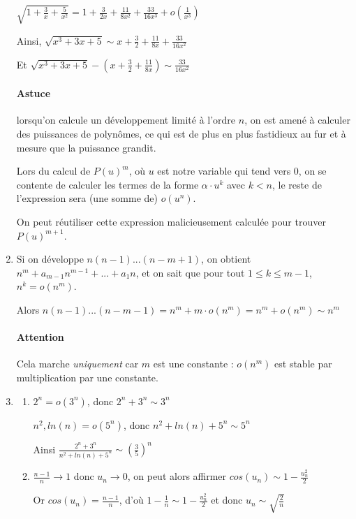\documentclass[]{article}
\begin{document}
\begin{enumerate}
$\sqrt{1+\frac{3}{x}+\frac{5}{x^2}}=1+\frac{3}{2x}+\frac{11}{8x^2}+\frac{33}{16x^3}+o(\frac{1}{x^3})$

Ainsi, $\sqrt{x^3+3x+5} \sim x + \frac{3}{2} + \frac{11}{8x} + \frac{33}{16x^2}$

Et $\sqrt{x^3+3x+5} - (x+\frac{3}{2} + \frac{11}{8x}) \sim \frac{33}{16x^2} $

\paragraph{Astuce} lorsqu'on calcule un développement limité à l'ordre $n$, on est amené à calculer des puissances de polynômes, ce qui est de plus en plus fastidieux au fur et à mesure que la puissance grandit.

Lors du calcul de $P(u)^m$, où $u$ est notre variable qui tend vers $0$, on se contente de calculer les termes de la forme $\alpha \cdot u^k$ avec $k < n$, le reste de l'expression sera (une somme de) $o(u^n)$.

On peut réutiliser cette expression malicieusement calculée pour trouver $P(u)^{m+1}$.

\item Si on développe $n(n-1)...(n-m+1)$, on obtient $n^m + a_{m-1} n^{m-1} + ... + a_1 n$, et on sait que pour tout $1 \leqslant k \leqslant m-1$, $n^k=o(n^m)$.

Alors $n(n-1)...(n-m-1)=n^m+m \cdot o(n^m) = n^m + o(n^m) \sim n^m$

\paragraph{Attention}
Cela marche \textit{uniquement} car $m$ est une constante : $o(n^m)$ est stable par multiplication par une constante.

\item
\begin{enumerate}
\item $2^n = o(3^n)$, donc $2^n+3^n \sim 3^n$

$n^2, ln(n)=o(5^n)$, donc $n^2+ln(n) + 5^n \sim 5^n$

Ainsi $\frac{2^n+3^n}{n^2+ln(n)+5^n} \sim \left(\frac{3}{5}\right)^n$

\item $\frac{n-1}{n} \to 1$ donc $u_n \to 0$, on peut alors affirmer $cos(u_n) \sim 1 - \frac{u^2_n}{2}$

Or $cos(u_n)=\frac{n-1}{n}$, d'où $1-\frac{1}{n} \sim 1- \frac{u^2_n}{2}$ et donc $u_n \sim \sqrt{\frac{2}{n}}$


\end{enumerate}
\end{enumerate}
\end{document}
